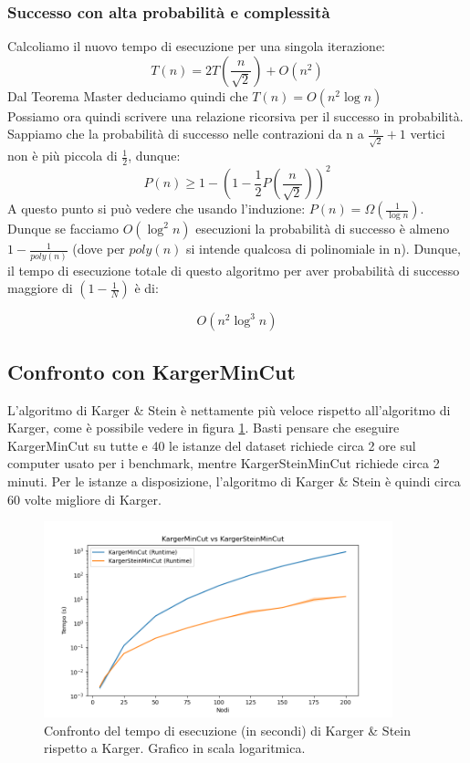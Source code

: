 \subsubsection{Successo con alta probabilità e complessità}
\label{sub:karger-stein-success-whp}

Calcoliamo il nuovo tempo di esecuzione per una singola iterazione:
$$T(n) = 2T \left( \dfrac{n}{\sqrt{2}} \right) + O(n^2) $$
Dal Teorema Master deduciamo quindi che $T(n) = O(n^2 \log{n})$\\

\noindent Possiamo ora quindi scrivere una relazione ricorsiva per il successo in probabilità. Sappiamo che la probabilità di successo nelle contrazioni da n a $\frac{n}{\sqrt{2}} + 1$ vertici non è più piccola di $\frac{1}{2}$, dunque:
$$P(n) \geq 1- \left( 1- \frac{1}{2} P \left(\dfrac{n}{\sqrt{2}} \right) \right)^2$$
A questo punto si può vedere che usando l'induzione: $P(n)= \Omega(\frac{1}{\log{n}}) $. Dunque se facciamo $O(\log^2{n})$ esecuzioni la probabilità di successo è almeno $1-\frac{1}{poly(n)}$ (dove per $poly(n)$ si intende qualcosa di polinomiale in n). Dunque, il tempo di esecuzione totale di questo algoritmo per aver probabilità di successo maggiore di $(1 - \frac{1}{N})$ è di:

$$O(n^2 \log^3{n})$$

\subsection{Confronto con KargerMinCut}

\noindent L'algoritmo di Karger \& Stein è nettamente più veloce rispetto all'algoritmo di Karger, come è possibile vedere in figura \ref{fig:karger-vs-karger-stein}. Basti pensare che eseguire KargerMinCut su tutte e 40 le istanze del dataset richiede circa 2 ore sul computer usato per i benchmark, mentre KargerSteinMinCut richiede circa 2 minuti. Per le istanze a disposizione, l'algoritmo di Karger \& Stein è quindi circa 60 volte migliore di Karger.

\begin{figure}[H]
    \centering

    \includegraphics[width=0.9\textwidth]{./images/karger_vs_karger_stein - log.png}

    \caption{Confronto del tempo di esecuzione (in secondi) di Karger \& Stein rispetto a Karger. Grafico in scala logaritmica.}
    \label{fig:karger-vs-karger-stein}
\end{figure}

